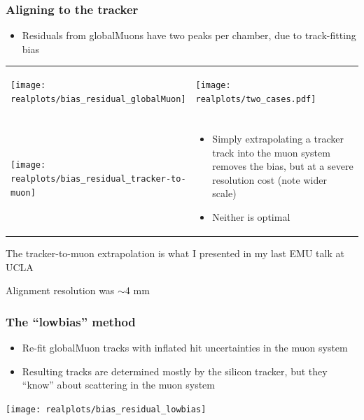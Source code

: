\documentclass[compress]{beamer}
\begin{document}
\begin{frame}
\frametitle{Aligning to the tracker}
\begin{itemize}
\item Residuals from globalMuons have two peaks per chamber, due to track-fitting bias
\end{itemize}

\begin{tabular}{p{0.4\linewidth} p{0.6\linewidth}}
\begin{minipage}{\linewidth}
\texttt{[image: realplots/bias\_residual\_globalMuon]}
\end{minipage} &
\begin{minipage}{\linewidth}
\begin{center}
\texttt{[image: realplots/two\_cases.pdf]}
\end{center}
\end{minipage} \\
 & \\
\begin{minipage}{\linewidth}
\texttt{[image: realplots/bias\_residual\_tracker-to-muon]}
\end{minipage} &
\begin{minipage}{\linewidth}
\begin{itemize}
\item Simply extrapolating a tracker track into the muon system removes the bias, but at a severe resolution cost (note wider scale)
\item Neither is optimal
\end{itemize}
\end{minipage}
\end{tabular}
\end{frame}

\begin{notes}
\item The tracker-to-muon extrapolation is what I presented in my last EMU talk at UCLA
\item Alignment resolution was $\sim$4 mm
\end{notes}

\begin{frame}
\frametitle{The ``lowbias'' method}
\begin{itemize}
\item Re-fit globalMuon tracks with inflated hit uncertainties in the muon system
\item Resulting tracks are determined mostly by the silicon tracker, but they ``know'' about scattering in the muon system
\end{itemize}
\begin{center}
\texttt{[image: realplots/bias\_residual\_lowbias]}
\end{center}
\end{frame}
\end{document}
